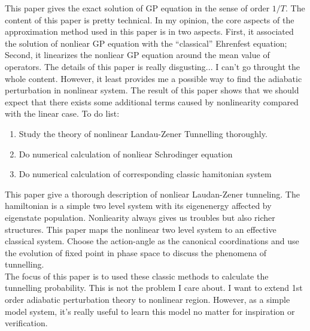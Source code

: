 \documentclass[fontsize=11pt, %
                             paper=a4, %
                             twoside, %
                             captions=tableheading,
                             index=totoc,
                             hyperref]{labbook}
\begin{document}
\begin{addmargin}[4cm]{0cm}
This paper gives the exact solution of GP equation in the sense of order $1/T$. The content of this paper is pretty technical. In my opinion, the core aspects of the approximation method used in this paper is in two aspects. First, it associated the solution of nonliear GP equation with the ``classical'' Ehrenfest equation; Second, it linearizes the nonliear GP equation around the mean value of operators. The details of this paper is really disgusting... I can't go throught the whole content. However, it least provides me a possible way to find the adiabatic perturbation in nonlinear system. The result of this paper shows that we should expect that there exists some additional terms caused by nonlinearity compared with the linear case. 
To do list:
\begin{enumerate}
\item
Study the theory of nonlinear Landau-Zener Tunnelling thoroughly.
\item
Do numerical calculation of nonliear Schrodinger equation
\item
Do numerical calculation of corresponding classic hamitonian system
\end{enumerate}
This paper give a thorough description of nonliear Laudan-Zener tunneling. The hamiltonian is a simple two level system with its eigenenergy affected by eigenstate population. Nonliearity always gives us troubles but also richer structures. This paper maps the nonlinear two level system to an effective classical system. Choose the action-angle as the canonical coordinations and use the evolution of fixed point in phase space to discuss the phenomena of tunnelling. \\
The focus of this paper is to used these classic methods to calculate the tunnelling probability. This is not the problem I care about. I want to extend 1st order adiabatic perturbation theory to nonlinear region. However, as a simple model system, it's really useful to learn this model no matter for inspiration or verification.\\


\end{addmargin}
\end{document}
